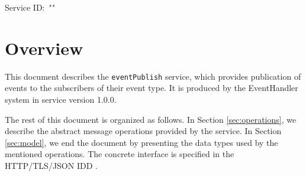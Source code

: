 \documentclass[a4paper]{arrowhead}
\begin{document}
\sloppy

\ArrowheadSetup

\begin{center}
  \vspace*{1cm}
  \huge{\arrowtitle}

  \vspace*{0.2cm}
  \LARGE{\arrowtype}
  \vspace*{1cm}

  \Large{Service ID: \textit{"\arrowid"}}

  \vspace*{\fill}


  \vspace*{1cm}
  \vspace*{\fill}

  \begin{abstract}
    This document describes the \texttt{eventPublish} service, version 1.0.0, produced by the EventHandler support system of Arrowhead 5.2.2.
  \end{abstract}

  \vspace*{1cm}
\end{center}

\newpage

\tableofcontents
\newpage

\section{Overview}
\label{sec:overview}

This document describes the \texttt{eventPublish} service, which provides publication of events to the subscribers of their event type.
It is produced by the EventHandler system \cite{eh-sysd} in service version 1.0.0.

The rest of this document is organized as follows.
In Section \ref{sec:operations}, we describe the abstract message operations provided by the service.
In Section \ref{sec:model}, we end the document by presenting the data types used by the mentioned operations.
The concrete interface is specified in the HTTP/TLS/JSON IDD \cite{eh-eventPublish-http-idd}.
\end{document}
